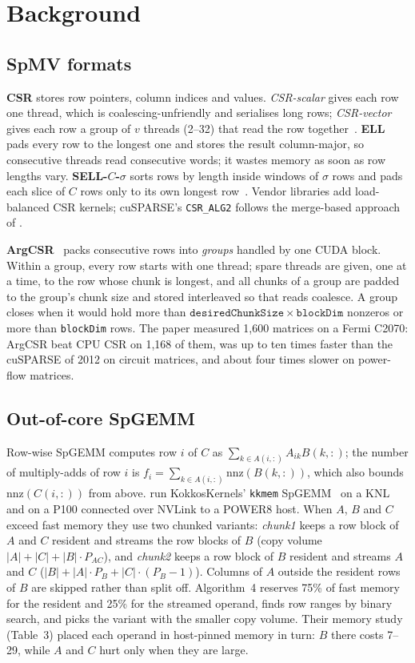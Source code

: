 \section{Background}\label{sec:background}

\subsection{SpMV formats}
\textbf{CSR} stores row pointers, column indices and values. \emph{CSR-scalar} gives each row one thread, which is
coalescing-unfriendly and serialises long rows; \emph{CSR-vector} gives each row a group of $v$ threads (2--32)
that read the row together~\cite{bell2009spmv}. \textbf{ELL} pads every row to the longest one and stores the
result column-major, so consecutive threads read consecutive words; it wastes memory as soon as row lengths vary.
\textbf{SELL-$C$-$\sigma$} sorts rows by length inside windows of $\sigma$ rows and pads each slice of $C$ rows
only to its own longest row~\cite{kreutzer2014sell}. Vendor libraries add load-balanced CSR kernels; cuSPARSE's
\texttt{CSR\_ALG2} follows the merge-based approach of \citet{merrill2016merge}.

\textbf{ArgCSR}~\cite{heller2012argcsr} packs consecutive rows into \emph{groups} handled by one CUDA block. Within a
group, every row starts with one thread; spare threads are given, one at a time, to the row whose chunk is longest,
and all chunks of a group are padded to the group's chunk size and stored interleaved so that reads coalesce. A group
closes when it would hold more than $\mathtt{desiredChunkSize}\times\mathtt{blockDim}$ nonzeros or more than
\texttt{blockDim} rows. The paper measured 1,600 matrices on a Fermi C2070: ArgCSR beat CPU CSR on 1,168 of them,
was up to ten times faster than the cuSPARSE of 2012 on circuit matrices, and about four times slower on
power-flow matrices.

\subsection{Out-of-core SpGEMM}
Row-wise SpGEMM computes row $i$ of $C$ as $\sum_{k \in A(i,:)} A_{ik} B(k,:)$; the number of multiply-adds of
row $i$ is $f_i = \sum_{k\in A(i,:)} \mathrm{nnz}(B(k,:))$, which also bounds $\mathrm{nnz}(C(i,:))$ from above.
\citet{deveci2018multilevel} run KokkosKernels' \texttt{kkmem} SpGEMM~\cite{deveci2018kkmem} on a KNL and on a P100
connected over NVLink to a POWER8 host. When $A$, $B$ and $C$ exceed fast memory they use two chunked variants:
\emph{chunk1} keeps a row block of $A$ and $C$ resident and streams the row blocks of $B$ (copy volume
$|A| + |C| + |B|\cdot P_{AC}$), and \emph{chunk2} keeps a row block of $B$ resident and streams $A$ and $C$
($|B| + |A|\cdot P_B + |C|\cdot(P_B - 1)$). Columns of $A$ outside the resident rows of $B$ are skipped rather than
split off. Algorithm~4 reserves 75\% of fast memory for the resident and 25\% for the streamed operand, finds row
ranges by binary search, and picks the variant with the smaller copy volume. Their memory study (Table~3) placed
each operand in host-pinned memory in turn: $B$ there costs 7--29\x, while $A$ and $C$ hurt only when they are large.


